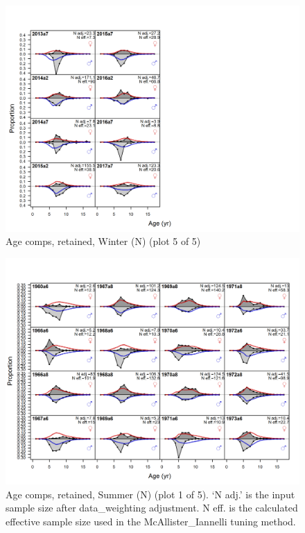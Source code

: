 \documentclass[12pt,]{article}
\begin{document}
\begin{figure}
\centering
\includegraphics{r4ss/plots_mod1/comp_agefit_flt1mkt2_page5.png}
\caption{Age comps, retained, Winter (N) (plot 5 of 5)
\label{fig:age_fits}}
\end{figure}

\begin{figure}
\centering
\includegraphics{r4ss/plots_mod1/comp_agefit_flt2mkt2_page1.png}
\caption{Age comps, retained, Summer (N) (plot 1 of 5). `N adj.' is the
input sample size after data\_weighting adjustment. N eff. is the
calculated effective sample size used in the McAllister\_Iannelli tuning
method. \label{fig:age_fits}}
\end{figure}
\end{document}

